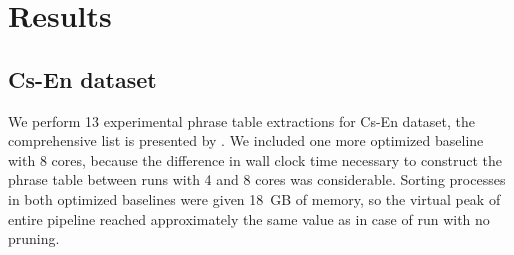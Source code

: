 \chapter{Results}
\label{chap:results}

\section{Cs-En dataset}
\label{sec:cs-en-results}

We perform 13 experimental phrase table extractions for Cs-En dataset,
the comprehensive list is presented by .
We included one more optimized baseline with 8 cores, because the difference in
wall clock time necessary to construct the phrase table between runs with 4 and 8 cores
was considerable.
Sorting processes in both optimized baselines were given 18~GB of memory, so the virtual
peak of entire pipeline reached approximately the same value as in case of \eppex{}
run with no pruning.

